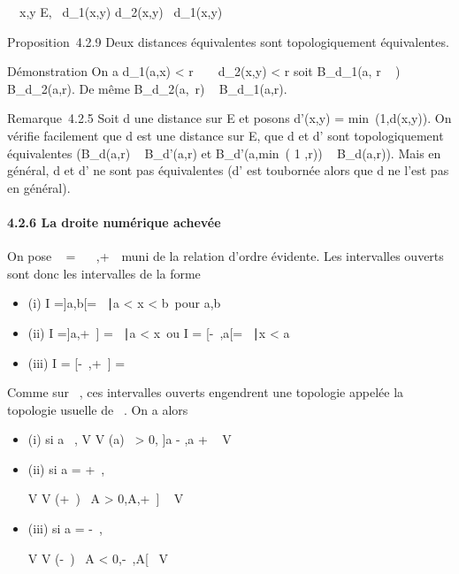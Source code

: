 \documentclass[]{article}
\begin{document}
\forall~~x,y \in E,\quad
\alpha~d\_1(x,y) \leq d\_2(x,y) \leq \beta~d\_1(x,y)

Proposition~4.2.9 Deux distances équivalentes sont topologiquement
équivalentes.

Démonstration On a d\_1(a,x) \textless{} r
\over \beta~ \rigtharrow~ d\_2(x,y) \textless{} r soit
B\_d\_1(a, r \over \beta~ ) \subset~
B\_d\_2(a,r). De même B\_d\_2(a,\alpha~r) \subset~
B\_d\_1(a,r).

Remarque~4.2.5 Soit d une distance sur E et posons d'(x,y)
= min~(1,d(x,y)). On vérifie facilement que d
est une distance sur E, que d et d' sont topologiquement équivalentes
(B\_d(a,r) \subset~ B\_d'(a,r) et
B\_d'(a,min~( 1  ,r)) \subset~ B\_d(a,r)). Mais en général, d et d' ne sont pas
équivalentes (d' est tou\jmathours bornée alors que d ne l'est pas en
général).

\paragraph{4.2.6 La droite numérique achevée}

On pose \overline{}~ = ~
\cup\-\infty~,+\infty~\ muni de la relation d'ordre
évidente. Les intervalles ouverts sont donc les intervalles de la forme

\begin{itemize}
\itemsep1pt\parskip0pt
\item
  (i) I ={]}a,b{[}= \x \in {}~∣a
  \textless{} x \textless{} b\ pour a,b
  \in\overline{}~
\item
  (ii) I ={]}a,+\infty~{]} = \x
  \in\overline{}~∣a
  \textless{} x\ ou I = {[}-\infty~,a{[}= \x
  \in\overline{}~∣x
  \textless{} a\
\item
  (iii) I = {[}-\infty~,+\infty~{]} = \overline{}~
\end{itemize}

Comme sur ~, ces intervalles ouverts engendrent une topologie appelée la
topologie usuelle de \overline\mathbb{R}~. On a alors

\begin{itemize}
\item
  (i) si a \in {}~, V \in V (a) \Leftrightarrow
  \exists~\epsilon \textgreater{} 0,\quad
  {]}a - \epsilon,a + \epsilon{[}\subset~ V
\item
  (ii) si a = +\infty~,

  V \in V (+\infty~) \Leftrightarrow \exists~A
  \textgreater{} 0,\quad {]}A,+\infty~{]} \subset~ V
\item
  (iii) si a = -\infty~,

  V \in V (-\infty~) \Leftrightarrow \exists~A
  \textless{} 0,\quad {[}-\infty~,A{[}\subset~ V
\end{itemize}
\end{document}

